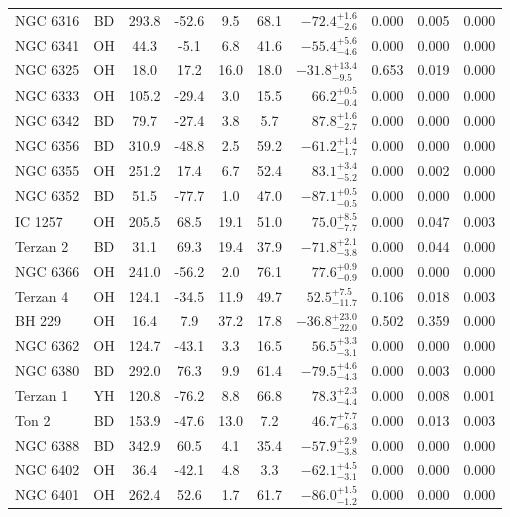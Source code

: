 \begin{tabular}{lcccccrccc}
	NGC 6316 & BD & 293.8 & -52.6 & 9.5 & 68.1 & $-72.4^{+1.6}_{-2.6}$ & 0.000 & 0.005 & 0.000 \\
	NGC 6341 & OH & 44.3 & -5.1 & 6.8 & 41.6 & $-55.4^{+5.6}_{-4.6}$ & 0.000 & 0.000 & 0.000 \\
	NGC 6325 & OH & 18.0 & 17.2 & 16.0 & 18.0 & $-31.8^{+13.4}_{-9.5}$ & 0.653 & 0.019 & 0.000 \\
	NGC 6333 & OH & 105.2 & -29.4 & 3.0 & 15.5 & $66.2^{+0.5}_{-0.4}$ & 0.000 & 0.000 & 0.000 \\
	NGC 6342 & BD & 79.7 & -27.4 & 3.8 & 5.7 & $87.8^{+1.6}_{-2.7}$ & 0.000 & 0.000 & 0.000 \\
	NGC 6356 & BD & 310.9 & -48.8 & 2.5 & 59.2 & $-61.2^{+1.4}_{-1.7}$ & 0.000 & 0.000 & 0.000 \\
	NGC 6355 & OH & 251.2 & 17.4 & 6.7 & 52.4 & $83.1^{+3.4}_{-5.2}$ & 0.000 & 0.002 & 0.000 \\
	NGC 6352 & BD & 51.5 & -77.7 & 1.0 & 47.0 & $-87.1^{+0.5}_{-0.5}$ & 0.000 & 0.000 & 0.000 \\
	IC 1257 & OH & 205.5 & 68.5 & 19.1 & 51.0 & $75.0^{+8.5}_{-7.7}$ & 0.000 & 0.047 & 0.003 \\
	Terzan 2 & BD & 31.1 & 69.3 & 19.4 & 37.9 & $-71.8^{+2.1}_{-3.8}$ & 0.000 & 0.044 & 0.000 \\
	NGC 6366 & OH & 241.0 & -56.2 & 2.0 & 76.1 & $77.6^{+0.9}_{-0.9}$ & 0.000 & 0.000 & 0.000 \\
	Terzan 4 & OH & 124.1 & -34.5 & 11.9 & 49.7 & $52.5^{+7.5}_{-11.7}$ & 0.106 & 0.018 & 0.003 \\
	BH 229 & OH & 16.4 & 7.9 & 37.2 & 17.8 & $-36.8^{+23.0}_{-22.0}$ & 0.502 & 0.359 & 0.000 \\
	NGC 6362 & OH & 124.7 & -43.1 & 3.3 & 16.5 & $56.5^{+3.3}_{-3.1}$ & 0.000 & 0.000 & 0.000 \\
	NGC 6380 & BD & 292.0 & 76.3 & 9.9 & 61.4 & $-79.5^{+4.6}_{-4.3}$ & 0.000 & 0.003 & 0.000 \\
	Terzan 1 & YH & 120.8 & -76.2 & 8.8 & 66.8 & $78.3^{+2.3}_{-4.4}$ & 0.000 & 0.008 & 0.001 \\
	Ton 2 & BD & 153.9 & -47.6 & 13.0 & 7.2 & $46.7^{+7.7}_{-6.3}$ & 0.000 & 0.013 & 0.003 \\
	NGC 6388 & BD & 342.9 & 60.5 & 4.1 & 35.4 & $-57.9^{+2.9}_{-3.8}$ & 0.000 & 0.000 & 0.000 \\
	NGC 6402 & OH & 36.4 & -42.1 & 4.8 & 3.3 & $-62.1^{+4.5}_{-3.1}$ & 0.000 & 0.000 & 0.000 \\
	NGC 6401 & OH & 262.4 & 52.6 & 1.7 & 61.7 & $-86.0^{+1.5}_{-1.2}$ & 0.000 & 0.000 & 0.000 \\

\end{tabular}
